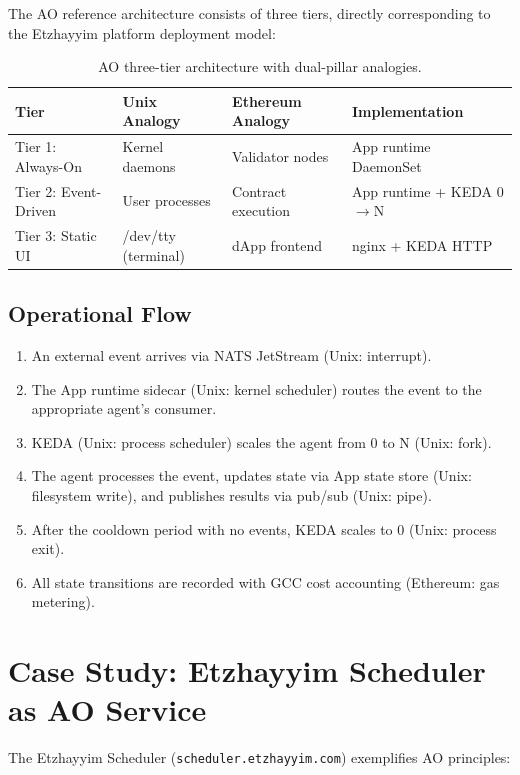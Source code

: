 \documentclass[11pt,a4paper]{article}
\begin{document}
The AO reference architecture consists of three tiers, directly
corresponding to the Etzhayyim platform deployment model:

\begin{table}[h]
\centering
\begin{tabular}{@{}llll@{}}
\toprule
\textbf{Tier} & \textbf{Unix Analogy} & \textbf{Ethereum Analogy} & \textbf{Implementation} \\
\midrule
Tier 1: Always-On & Kernel daemons & Validator nodes & App runtime DaemonSet \\
Tier 2: Event-Driven & User processes & Contract execution & App runtime + KEDA 0$\rightarrow$N \\
Tier 3: Static UI & /dev/tty (terminal) & dApp frontend & nginx + KEDA HTTP \\
\bottomrule
\end{tabular}
\caption{AO three-tier architecture with dual-pillar analogies.}
\end{table}

\subsection{Operational Flow}

\begin{enumerate}[nosep]
  \item An external event arrives via NATS JetStream (Unix: interrupt).
  \item The App runtime sidecar (Unix: kernel scheduler) routes the event to
    the appropriate agent's consumer.
  \item KEDA (Unix: process scheduler) scales the agent from 0 to N
    (Unix: fork).
  \item The agent processes the event, updates state via App state store
    (Unix: filesystem write), and publishes results via pub/sub
    (Unix: pipe).
  \item After the cooldown period with no events, KEDA scales to 0
    (Unix: process exit).
  \item All state transitions are recorded with GCC cost accounting
    (Ethereum: gas metering).
\end{enumerate}

\section{Case Study: Etzhayyim Scheduler as AO Service}

The Etzhayyim Scheduler (\texttt{scheduler.etzhayyim.com}) exemplifies AO principles:
\end{document}
